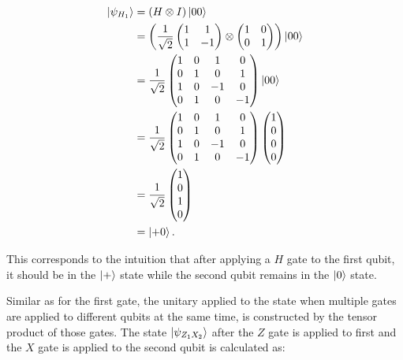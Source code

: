 \begin{align}
  \Ket{\psi_{H_1}}  &= (H \otimes I) \Ket{00} \\
                   &= \left(\frac{1}{\sqrt{2}} \begin{pmatrix} 1 & 1 \\ 1 & -1 \end{pmatrix} \otimes \begin{pmatrix} 1 & 0 \\ 0 & 1 \end{pmatrix}\right) \Ket{00} \\
                    &= \frac{1}{\sqrt{2}} \begin{pmatrix} 1 & 0 & 1 & 0 \\ 0 & 1 & 0 & 1 \\ 1 & 0 & -1 & 0 \\ 0 & 1 & 0 & -1 \end{pmatrix} \Ket{00} \\
                    &= \frac{1}{\sqrt{2}} \begin{pmatrix} 1 & 0 & 1 & 0 \\ 0 & 1 & 0 & 1 \\ 1 & 0 & -1 & 0 \\ 0 & 1 & 0 & -1 \end{pmatrix} \begin{pmatrix} 1 \\ 0 \\ 0 \\ 0 \end{pmatrix} \\
                    &= \frac{1}{\sqrt{2}} \begin{pmatrix} 1 \\ 0 \\ 1 \\ 0 \end{pmatrix} \\
                    &= \Ket{+0}.
\end{align}

This corresponds to the intuition that after applying a $H$ gate to the first
qubit, it should be in the $\Ket{+}$ state while the second qubit remains in
the $\Ket{0}$ state.

Similar as for the first gate, the unitary applied to the state when multiple
gates are applied to different qubits at the same time, is constructed by the
tensor product of those gates. The state $\Ket{\psi_{Z_1X_2}}$ after the $Z$
gate is applied to first and the $X$ gate is applied to the second qubit is
calculated as:

